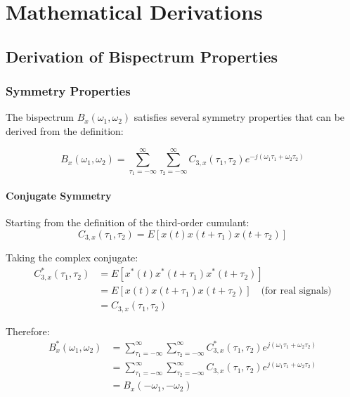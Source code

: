 
\chapter{Mathematical Derivations}

\section{Derivation of Bispectrum Properties}

\subsection{Symmetry Properties}

The bispectrum $B_x(\omega_1, \omega_2)$ satisfies several symmetry properties that can be derived from the definition:

\begin{equation}
B_x(\omega_1, \omega_2) = \sum_{\tau_1=-\infty}^{\infty} \sum_{\tau_2=-\infty}^{\infty} C_{3,x}(\tau_1, \tau_2) e^{-j(\omega_1\tau_1 + \omega_2\tau_2)}
\end{equation}

\subsubsection{Conjugate Symmetry}

Starting from the definition of the third-order cumulant:
\begin{equation}
C_{3,x}(\tau_1, \tau_2) = E[x(t)x(t+\tau_1)x(t+\tau_2)]
\end{equation}

Taking the complex conjugate:
\begin{align}
C_{3,x}^*(\tau_1, \tau_2) &= E[x^*(t)x^*(t+\tau_1)x^*(t+\tau_2)] \\
&= E[x(t)x(t+\tau_1)x(t+\tau_2)] \quad \text{(for real signals)} \\
&= C_{3,x}(\tau_1, \tau_2)
\end{align}

Therefore:
\begin{align}
B_x^*(\omega_1, \omega_2) &= \sum_{\tau_1=-\infty}^{\infty} \sum_{\tau_2=-\infty}^{\infty} C_{3,x}^*(\tau_1, \tau_2) e^{j(\omega_1\tau_1 + \omega_2\tau_2)} \\
&= \sum_{\tau_1=-\infty}^{\infty} \sum_{\tau_2=-\infty}^{\infty} C_{3,x}(\tau_1, \tau_2) e^{j(\omega_1\tau_1 + \omega_2\tau_2)} \\
&= B_x(-\omega_1, -\omega_2)
\end{align}

